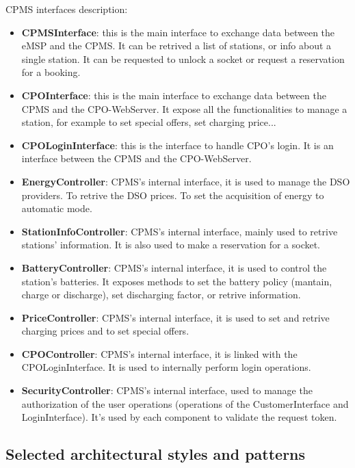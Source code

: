 CPMS interfaces description:
\begin{itemize}
    \item \textbf{CPMSInterface}: this is the main interface to exchange data between the eMSP and the CPMS. It can be retrived a list of stations, or info about a single station. It can be requested to unlock a socket or request a reservation for a booking.
    \item \textbf{CPOInterface}: this is the main interface to exchange data between the CPMS and the CPO-WebServer. It expose all the functionalities to manage a station, for example to set special offers, set charging price...
    \item \textbf{CPOLoginInterface}: this is the interface to handle CPO's login. It is an interface between the CPMS and the CPO-WebServer.
    \item \textbf{EnergyController}: CPMS's internal interface, it is used to manage the DSO providers. To retrive the DSO prices. To set the acquisition of energy to automatic mode.
    \item \textbf{StationInfoController}: CPMS's internal interface, mainly used to retrive stations' information. It is also used to make a reservation for a socket.
    \item \textbf{BatteryController}: CPMS's internal interface, it is used to control the station's batteries. It exposes methods to set the battery policy (mantain, charge or discharge), set discharging factor, or retrive information.
    \item \textbf{PriceController}: CPMS's internal interface, it is used to set and retrive charging prices and to set special offers.
    \item \textbf{CPOController}: CPMS's internal interface, it is linked with the CPOLoginInterface. It is used to internally perform login operations.
    \item \textbf{SecurityController}: CPMS's internal interface, used to manage the authorization of the user operations (operations of the CustomerInterface and LoginInterface). It's used by each component to validate the request token.
    
\end{itemize}

\subsection{Selected architectural styles and patterns}

